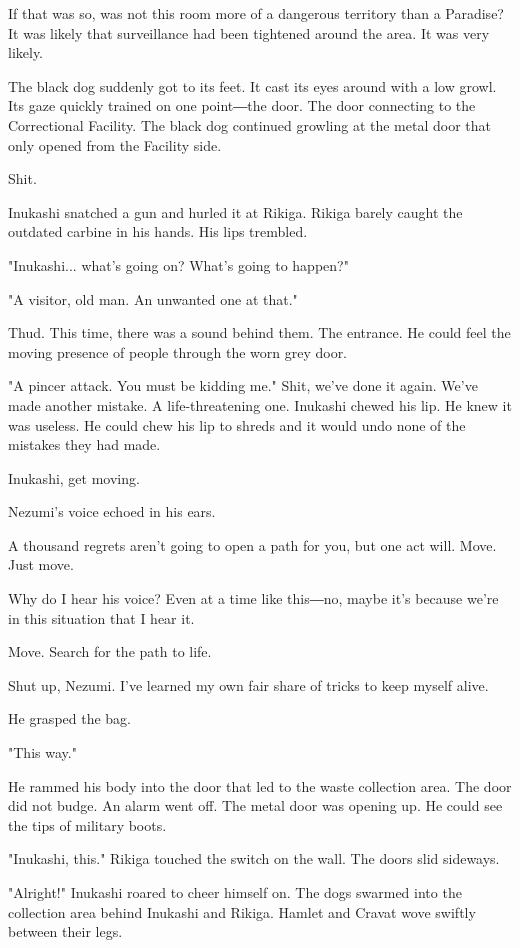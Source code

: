 If that was so, was not this room more of a dangerous territory than a
Paradise? It was likely that surveillance had been tightened around the
area. It was very likely.

The black dog suddenly got to its feet. It cast its eyes around with a
low growl. Its gaze quickly trained on one point―the door. The door
connecting to the Correctional Facility. The black dog continued
growling at the metal door that only opened from the Facility side.

Shit.

Inukashi snatched a gun and hurled it at Rikiga. Rikiga barely caught
the outdated carbine in his hands. His lips trembled.

"Inukashi... what's going on? What's going to happen?"

"A visitor, old man. An unwanted one at that."

Thud. This time, there was a sound behind them. The entrance. He could
feel the moving presence of people through the worn grey door.

"A pincer attack. You must be kidding me." Shit, we've done it again.
We've made another mistake. A life-threatening one. Inukashi chewed his
lip. He knew it was useless. He could chew his lip to shreds and it
would undo none of the mistakes they had made.

Inukashi, get moving.

Nezumi's voice echoed in his ears.

A thousand regrets aren't going to open a path for you, but one act
will. Move. Just move.

Why do I hear his voice? Even at a time like this―no, maybe it's because
we're in this situation that I hear it.

Move. Search for the path to life.

Shut up, Nezumi. I've learned my own fair share of tricks to keep myself
alive.

He grasped the bag.

"This way."

He rammed his body into the door that led to the waste collection area.
The door did not budge. An alarm went off. The metal door was opening
up. He could see the tips of military boots.

"Inukashi, this." Rikiga touched the switch on the wall. The doors slid
sideways.

"Alright!" Inukashi roared to cheer himself on. The dogs swarmed into
the collection area behind Inukashi and Rikiga. Hamlet and Cravat wove
swiftly between their legs.

